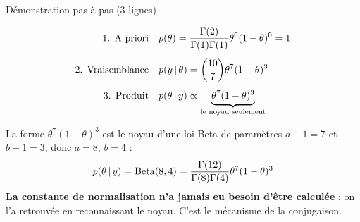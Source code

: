 \begin{frame}{Démonstration pas à pas (3 lignes)}
\begin{abox}
\[
\begin{aligned}
\text{1. A priori}\quad & p(\theta) = \frac{\Gamma(2)}{\Gamma(1)\Gamma(1)}\theta^{0}(1-\theta)^{0} = 1 \\[1.5mm]
\text{2. Vraisemblance}\quad & p(y \,\vert\, \theta) = \binom{10}{7}\theta^{7}(1-\theta)^{3} \\[1.5mm]
\text{3. Produit}\quad & p(\theta \,\vert\, y) \propto \underbrace{\theta^{7}(1-\theta)^{3}}_{\text{le noyau seulement}}
\end{aligned}
\]
\end{abox}
\vspace{1mm}
\begin{solbox}
La forme $\theta^{7}(1-\theta)^{3}$ est le noyau d'une loi Beta de paramètres
$a-1 = 7$ et $b-1 = 3$, donc $a = 8$, $b = 4$ :
\[
p(\theta \,\vert\, y) = \mathrm{Beta}(8,4) = \frac{\Gamma(12)}{\Gamma(8)\Gamma(4)}\theta^{7}(1-\theta)^{3}
\]
\textbf{La constante de normalisation n'a jamais eu besoin d'être calculée} : on l'a
retrouvée en reconnaissant le noyau. C'est le mécanisme de la conjugaison.
\end{solbox}
\end{frame}

